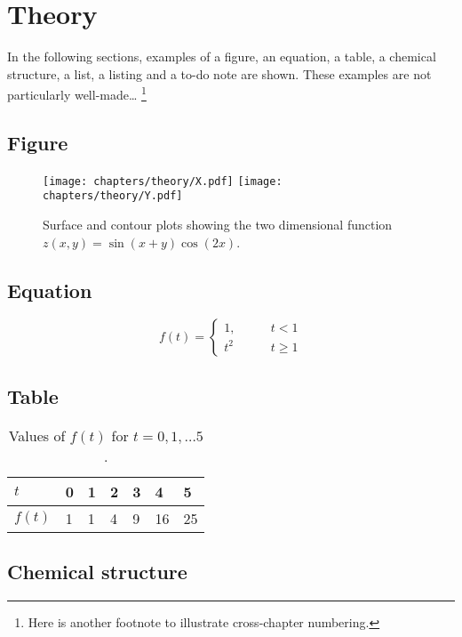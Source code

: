 \chapter{Theory}

In the following sections, examples of a figure, an equation, a table, a chemical structure, a list, a listing and a to-do note are shown.
These examples are not particularly well-made\dots%
\footnote{Here is another footnote to illustrate cross-chapter numbering.}

\section{Figure}
\begin{figure}[H]
    \centering
    \texttt{[image: chapters/theory/X.pdf]}
    \texttt{[image: chapters/theory/Y.pdf]}
    \caption{Surface and contour plots showing the two dimensional function $z(x,y)=\sin(x+y)\cos(2x)$.}
\end{figure}

\section{Equation}
\begin{equation}
    f(t)=\left\{%
    \begin{array}{ll}
        1,\qquad & t< 1 \\
        t^2 & t\geq 1
    \end{array}\right.
\end{equation}

\section{Table}
\begin{table}[H]
    \centering
    \caption[This (instead of the potentially long caption) appears in the list of tables.]{Values of $f(t)$ for $t=0,1,\dots 5$.}
    \begin{tabular}{lllllll}
        \toprule
        $t$ & 0 & 1 & 2 & 3 & 4 & 5 \\ \midrule
        $f(t)$ & 1 & 1 & 4 & 9 & 16 & 25 \\ \bottomrule
    \end{tabular}
\end{table}

\section{Chemical structure}
\begin{center}
\end{center}

